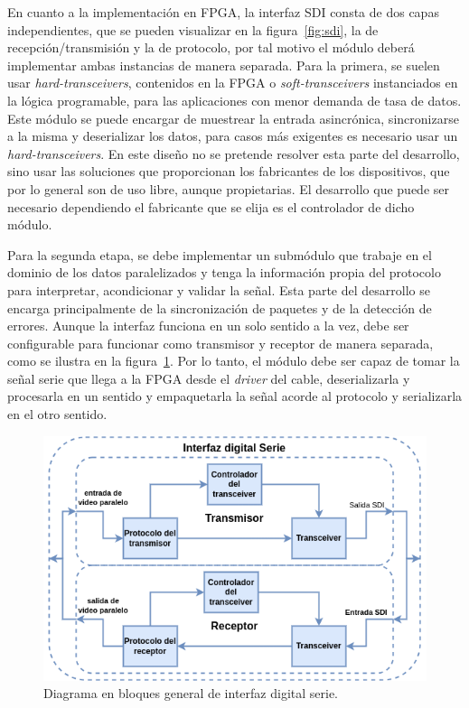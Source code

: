   En cuanto a la implementación en FPGA, la interfaz SDI consta de dos capas
  independientes, que se pueden visualizar en la figura~\ref{fig:sdi}, la de
  recepción/transmisión y la de protocolo, por tal motivo el módulo deberá
  implementar ambas instancias de manera separada. Para la primera, se suelen
  usar \textit{hard-transceivers}, contenidos en la FPGA o \textit{soft-transceivers}
  instanciados en la lógica programable, para las aplicaciones con menor demanda
  de tasa de datos. Este módulo se puede encargar de muestrear la entrada
  asincrónica, sincronizarse a la misma y deserializar los datos, para casos más
  exigentes es necesario usar un \textit{hard-transceivers}. En este diseño no se
  pretende resolver esta parte del desarrollo, sino usar las soluciones que
  proporcionan los fabricantes de los dispositivos, que por lo general son de uso
  libre, aunque propietarias. El desarrollo que puede ser necesario dependiendo
  el fabricante que se elija es el controlador de dicho módulo.

  Para la segunda etapa, se debe implementar un submódulo que trabaje en el dominio
  de los datos paralelizados y tenga la información propia del protocolo para
  interpretar, acondicionar y validar la señal. Esta parte del desarrollo se
  encarga principalmente de la sincronización de paquetes y de la detección de
  errores. Aunque la interfaz funciona en un solo sentido a la vez, debe ser
  configurable para funcionar como transmisor y receptor de manera separada, como
  se ilustra en la figura~\ref{fig:sdi1}. Por lo tanto, el módulo debe ser capaz
  de tomar la señal serie que llega a la FPGA desde el \textit{driver} del cable,
  deserializarla y procesarla en un sentido y empaquetarla la señal acorde al
  protocolo y serializarla en el otro sentido.

  \vspace{1cm}
  \begin{figure}[htbp]
      \centering
      \includegraphics[width=\linewidth]{./Figures/sdi.png}
      \caption{Diagrama en bloques general de interfaz digital serie.}\label{fig:sdi1}
  \end{figure}
  \vspace{1cm}

